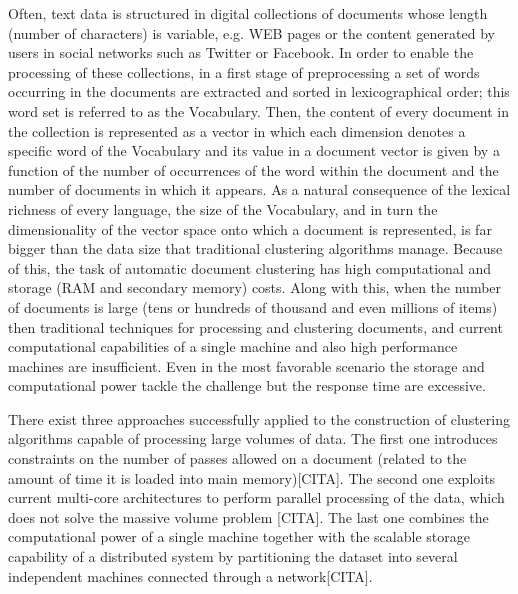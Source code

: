 \documentclass[a4paper]{article}
\begin{document}
Often, text data is structured in digital collections of documents whose length (number of characters) is variable, e.g. WEB pages or the content generated by users in social networks such as Twitter or Facebook. In order to enable the processing of these collections, in a first stage of preprocessing a set of words occurring in the documents are extracted and sorted in lexicographical order; this word set is referred to as the Vocabulary. Then, the content of every document in the collection is represented as a vector in which each dimension denotes a specific word of the Vocabulary and its value in a document vector is given by a function of the number of occurrences of the word within the document and the number of documents in which it appears. As a natural consequence of the lexical richness of every language, the size of the Vocabulary, and in turn the dimensionality of the vector space onto which a document is represented,  is far bigger than the data size that traditional clustering algorithms manage. Because of this, the task of automatic document clustering has high computational and storage (RAM and secondary memory) costs. Along with this, when the number of documents is large (tens or hundreds of thousand and even millions of items) then traditional techniques for processing and clustering documents, and current computational capabilities of a single machine and also high performance machines are insufficient. Even in the most favorable scenario the storage and computational power tackle the challenge but the response time are excessive.


There exist three approaches successfully applied to the construction of clustering algorithms capable of processing large volumes of data. The first one introduces constraints on the number of passes allowed on a document (related to the amount of time it is loaded into main memory)[CITA]. The second one exploits current multi-core architectures to perform parallel processing of the data, which does not solve the massive volume problem [CITA]. The last one combines the computational power of a single machine together with the scalable storage capability of a distributed system by partitioning the dataset into several independent machines connected through a network[CITA].
\end{document}
